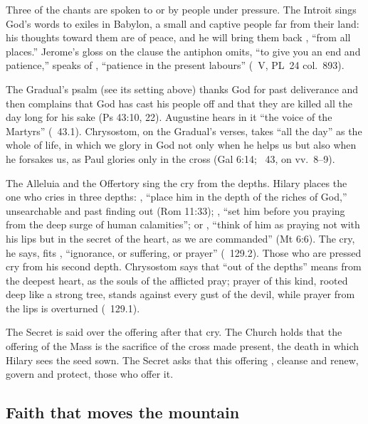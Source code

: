Three of the chants are spoken to or by people under pressure. The Introit
sings God's words to exiles in Babylon, a small and captive people far from their land: his
thoughts toward them are of peace, and he will bring them back , ``from all places.'' Jerome's gloss on the clause the
antiphon omits, ``to give you an end and patience,'' speaks of , ``patience in the present labours'' (~V, PL~24 col.~893).

The Gradual's psalm (see its setting above) thanks God for past
deliverance and then complains that God has cast his people off and that they
are killed all the day long for his sake (Ps 43:10, 22). Augustine hears in it
``the voice of the Martyrs'' (~43.1). Chrysostom, on the
Gradual's verses, takes ``all the day'' as the whole of life, in which we glory
in God not only when he helps us but also when he forsakes us, as Paul glories
only in the cross (Gal 6:14; ~43, on vv.~8--9).

The Alleluia and the Offertory sing the cry from the depths. Hilary places the
one who cries in three depths: , ``place him in the depth of the riches of God,'' unsearchable and past
finding out (Rom 11:33); , ``set him before you praying from the deep surge of human
calamities''; or , ``think of him as praying not with his lips but in the secret
of the heart, as we are commanded'' (Mt 6:6). The cry, he says, fits
, ``ignorance, or
suffering, or prayer'' (~129.2). Those who are pressed
cry from his second depth. Chrysostom says that ``out of the depths''
means from the deepest heart, as the souls of the afflicted pray; prayer of
this kind, rooted deep like a strong tree, stands
against every gust of the devil, while prayer from the lips is overturned
(~129.1).

The Secret is said over the offering after that cry. The Church holds that
the offering of the Mass is the sacrifice of the cross made present, the death
in which Hilary sees the seed sown. The Secret asks that this offering
, cleanse and renew,
govern and protect, those who offer it.

\subsection{Faith that moves the mountain}
\label{sec:seed-communion}

